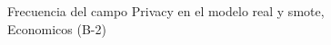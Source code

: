 \begin{figure}[H]
    \centering
    
    \caption{Frecuencia del campo Privacy en el modelo real y smote, Economicos (B-2)}
    \label{frecuency-Privacy-smote-enc}
\end{figure}